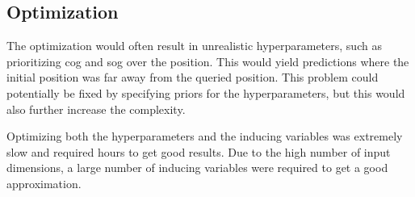 \subsection{Optimization}
The optimization would often result in unrealistic hyperparameters, such as prioritizing \acrshort{cog} and \acrshort{sog} over the position. This would yield predictions where the initial position was far away from the queried position. This problem could potentially be fixed by specifying priors for the hyperparameters, but this would also further increase the complexity. 

Optimizing both the hyperparameters and the inducing variables was extremely slow and required hours to get good results. Due to the high number of input dimensions, a large number of inducing variables were required to get a good approximation. 




